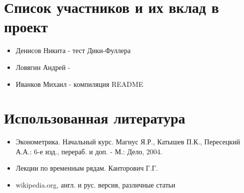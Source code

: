 \documentclass{article}
\begin{document}
\newpage
  

\section{Список участников и их вклад в проект}

\begin{itemize}
    \item Денисов Никита - тест Дики-Фуллера
    \item Ловягин Андрей -
    \item Иванков Михаил - компиляция README
\end{itemize}{}

\section{Использованная литература}

\begin{itemize}
    \item Эконометрика. Начальный курс.  Магнус Я.Р., Катышев П.К., Пересецкий А.А.: 6-е изд., перераб. и доп. - М.: Дело, 2004.
    \item Лекции по временным рядам. Канторович Г.Г.
    \item wikipedia.org, англ. и рус. версия, различные статьи
\end{itemize}
  
\end{document}
